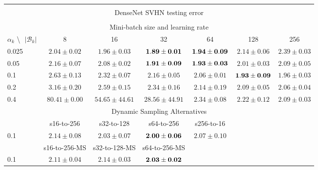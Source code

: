 \documentclass[10pt,journal,compsoc]{IEEEtran}
\begin{document}
\begin{table*}[!htbp]
\begin{center}
{\begin{tabular}{|l|c|c|c|c|c|c|}
\multicolumn{7}{|c|}{} \\
\multicolumn{7}{|c|}{DenseNet SVHN testing error} \\
\multicolumn{7}{|c|}{} \\
\hline
\multicolumn{7}{|c|}{Mini-batch size and learning rate} \\
\hline
$\alpha_k$ \textbackslash $ \text{   } {|\mathcal{B}_k|}$ & 8 & 16 & 32 & 64 & 128 & 256\\
\hline
0.025 &  $2.04\pm0.02$ & $1.96\pm0.03$ & $\bf 1.89\pm0.01$ & $\bf 1.94\pm0.09$ & $2.14\pm0.06$ & $2.39\pm0.03$  \\
\hline
0.05  & $2.16\pm0.07$ & $2.08\pm0.02$ & $\bf 1.91\pm0.09$ & $\bf 1.93\pm0.03$ & $2.01\pm0.03$ & $2.09\pm0.05$  \\
\hline
0.1   & $2.63\pm0.13$ & $2.32\pm0.07$ & $2.16\pm0.05$ & $2.06\pm0.01$ & $\bf 1.93\pm0.09$ & $1.96\pm0.03$  \\
\hline
0.2   & $3.16\pm0.20$ & $2.59\pm0.15$ & $2.34\pm0.16$ & $2.14\pm0.19$ & $2.09\pm0.05$ & $2.06\pm0.04$  \\
\hline
0.4   & $80.41\pm0.00$ & $54.65\pm44.61$ & $28.56\pm44.91$ & $2.34\pm0.08$ & $2.22\pm0.12$ & $2.09\pm0.03$ \\
\hline
\multicolumn{7}{|c|}{Dynamic Sampling Alternatives}\\
\hline
& s16-to-256  & s32-to-128 & s64-to-256 & s256-to-16 & & \\
\hline
0.1   & $2.14\pm0.08$ & $2.03\pm0.07$ & $\bf 2.00\pm0.06$ & $2.07\pm0.10$ & & \\
\hline
& s16-to-256-MS & s32-to-128-MS & s64-to-256-MS & 
& & \\
\hline
0.1 & $2.11\pm0.04$ & $2.14\pm0.03$ & $\bf 2.03\pm0.02$ & 
& & \\
\hline
\end{tabular}}
\end{center}
\end{table*}


\end{document}
